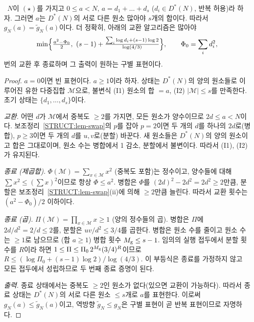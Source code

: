 \begin{theorem}\label{STRUCT:thm-dedup}
\PROVED\ $N$이 $(\star)$를 가지고 $0\le a<N$, $a=d_1+\dots+d_s$ ($d_i\in D^*(N)$, 반복 허용)라 하자. 그러면 $a$는 $D^*(N)$의 서로 다른 원소 많아야 $s$개의 합이다. 따라서 $g_N(a)=\widetilde g_N(a)$이다.
더 정확히, 아래의 교환 알고리즘은 많아야
\[
\min\Bigl\{\tfrac{a^2-\Phi_0}{2},\ (s-1)+\tfrac{\sum_i\log d_i+(s-1)\log2}{\log(4/3)}\Bigr\},\qquad \Phi_0=\sum_i d_i^2,
\]
번의 교환 후 종료하며 그 출력이 원하는 구별 표현이다.
\end{theorem}
\begin{proof}
$a=0$이면 빈 표현이다. $a\ge1$이라 하자. 상태는 $D^*(N)$의 양의 원소들로 이루어진 유한 다중집합 $\mathcal M$으로, 불변식 (I1) 원소의 합 $=a$, (I2) $|\mathcal M|\le s$를 만족한다. 초기 상태는 $\{d_1,\dots,d_s\}$이다.

\emph{교환.} 어떤 $d$가 $\mathcal M$에서 중복도 $\ge2$를 가지면, 모든 원소가 양수이므로 $2d\le a<N$이다. 보조정리~\ref{STRUCT:lem-swap}의 $p$를 잡아 $p=2$이면 두 개의 $d$를 하나의 $2d$로(병합), $p\ge3$이면 두 개의 $d$를 $u,v$로(분할) 바꾼다. 새 원소들은 $D^*(N)$의 양의 원소이고 합은 그대로이며, 원소 수는 병합에서 1 감소, 분할에서 불변이다. 따라서 (I1), (I2)가 유지된다.

\emph{종료 (제곱합).} $\Phi(\mathcal M)=\sum_{x\in\mathcal M}x^2$ (중복도 포함)는 정수이고, 양수들에 대해 $\sum x^2\le(\sum x)^2$이므로 항상 $\Phi\le a^2$. 병합은 $\Phi$를 $(2d)^2-2d^2=2d^2\ge2$만큼, 분할은 보조정리~\ref{STRUCT:lem-swap}(ii)에 의해 $\ge2$만큼 늘린다. 따라서 교환 횟수는 $(a^2-\Phi_0)/2$ 이하이다.

\emph{종료 (곱).} $\Pi(\mathcal M)=\prod_{x\in\mathcal M}x\ge1$ (양의 정수들의 곱). 병합은 $\Pi$에 $2d/d^2=2/d\le2$를, 분할은 $uv/d^2\le3/4$를 곱한다. 병합은 원소 수를 줄이고 원소 수는 $\ge1$로 남으므로 (합 $a\ge1$) 병합 횟수 $M_{\rm g}\le s-1$. 임의의 실행 접두에서 분할 횟수를 $R$이라 하면 $1\le\Pi\le\Pi_0\,2^{M_{\rm g}}(3/4)^R$이므로 $R\le(\log\Pi_0+(s-1)\log2)/\log(4/3)$. 이 부등식은 종료를 가정하지 않고 모든 접두에서 성립하므로 두 번째 종료 증명이 된다.

\emph{출력.} 종료 상태에서는 중복도 $\ge2$인 원소가 없다(있으면 교환이 가능하다). 따라서 종료 상태는 $D^*(N)$의 서로 다른 원소 $\le s$개로 $a$를 표현한다. 이로써 $g_N(a)\le\widetilde g_N(a)$이고, 역방향 $\widetilde g_N\le g_N$은 구별 표현이 곧 반복 표현이므로 자명하다.
\end{proof}

